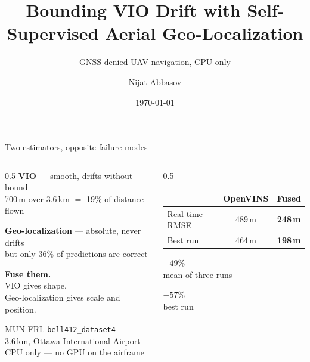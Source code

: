 \documentclass[aspectratio=169]{beamer}
\title{Bounding VIO Drift with Self-Supervised Aerial Geo-Localization}
\subtitle{GNSS-denied UAV navigation, CPU-only}
\author{Nijat Abbasov}
\date{\today}
\begin{document}
\begin{frame}
\titlepage
\end{frame}

\begin{frame}{Two estimators, opposite failure modes}
\begin{columns}[T]
\begin{column}{0.5\textwidth}
\textbf{VIO} --- smooth, drifts without bound\\
{\small 700\,m over 3.6\,km $=$ 19\% of distance flown}

\vspace{0.9em}
\textbf{Geo-localization} --- absolute, never drifts\\
{\small but only 36\% of predictions are correct}

\vspace{1.3em}
\textbf{Fuse them.}\\
{\small VIO gives shape.\\Geo-localization gives scale and position.}

\vspace{1.3em}
{\small MUN-FRL \texttt{bell412\_dataset4}\\
3.6\,km, Ottawa International Airport\\
CPU only --- no GPU on the airframe}
\end{column}
\begin{column}{0.5\textwidth}
\centering
\vspace{1.5em}
\begin{tabular}{@{}lcc@{}}
\toprule
 & OpenVINS & Fused \\
\midrule
Real-time RMSE & 489\,m & \textbf{248\,m} \\
Best run & 464\,m & \textbf{198\,m} \\
\bottomrule
\end{tabular}

\vspace{2em}
{\large $-49\%$}\\[0.2em]
{\small mean of three runs}

\vspace{1em}
{\large $-57\%$}\\[0.2em]
{\small best run}
\end{column}
\end{columns}
\end{frame}
\end{document}
